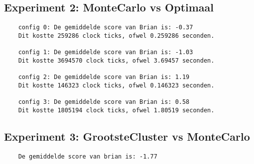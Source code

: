 \documentclass[10pt]{article}
\begin{document}
\subsection{Experiment 2: MonteCarlo vs Optimaal}

\begin{verbatim}
    config 0: De gemiddelde score van Brian is: -0.37
    Dit kostte 259286 clock ticks, ofwel 0.259286 seconden.
    
    config 1: De gemiddelde score van Brian is: -1.03
    Dit kostte 3694570 clock ticks, ofwel 3.69457 seconden.
    
    config 2: De gemiddelde score van Brian is: 1.19
    Dit kostte 146323 clock ticks, ofwel 0.146323 seconden.
    
    config 3: De gemiddelde score van Brian is: 0.58
    Dit kostte 1805194 clock ticks, ofwel 1.80519 seconden.
\end{verbatim}

\subsection{Experiment 3: GrootsteCluster vs MonteCarlo }
\begin{verbatim}
    De gemiddelde score van brian is: -1.77
\end{verbatim}
\end{document}
